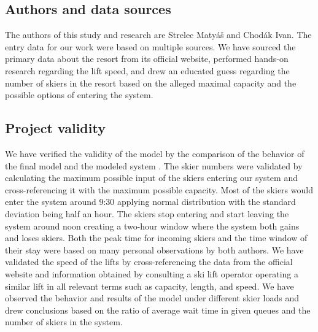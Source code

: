 \documentclass[11pt,a4paper]{article}
\begin{document}
\subsection{Authors and data sources}
The authors of this study and research are Strelec Matyáš and Chodák Ivan. \newline
The entry data for our work were based on multiple sources. We have sourced the primary data about the resort from its official website\cite{ricky}, performed hands-on research regarding the lift speed, and drew an educated guess regarding the number of skiers in the resort based on the alleged maximal capacity \cite{stavebniserver} and the possible options of entering the system.

\subsection{Project validity}
We have verified the validity of the model \cite[slide 37]{slides} by the comparison of the behavior of the final model \cite[slide 47]{slides} and the modeled system \cite[slide 7]{slides}. The skier numbers were validated by calculating the maximum possible input of the skiers entering our system and cross-referencing it with the maximum possible capacity. Most of the skiers would enter the system around 9:30 applying normal distribution \cite[slide 93]{slides} with the standard deviation being half an hour. The skiers stop entering and start leaving the system around noon creating a two-hour window where the system both gains and loses skiers. Both the peak time for incoming skiers and the time window of their stay were based on many personal observations by both authors. We have validated the speed of the lifts by cross-referencing the data from the official website and information obtained by consulting a ski lift operator operating a similar lift in all relevant terms such as capacity, length, and speed. \newline We have observed the behavior and results of the model under different skier loads and drew conclusions based on the ratio of average wait time in given queues and the number of skiers in the system.
\end{document}
